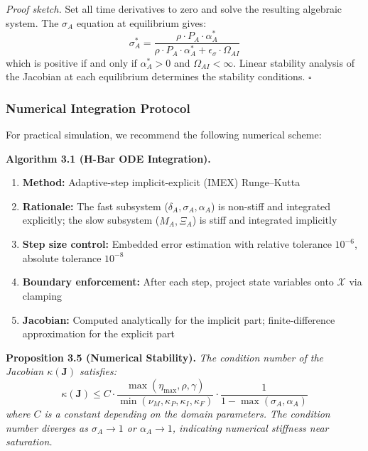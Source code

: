 \documentclass[11pt,a4paper]{article}
\begin{document}
\textit{Proof sketch.} Set all time derivatives to zero and solve the
resulting algebraic system. The $\sigma_A$ equation at equilibrium gives:
\begin{equation}\label{eq:sigma-equilibrium}
\sigma_A^* = \frac{\rho \cdot P_A \cdot \alpha_A^*}{\rho \cdot P_A \cdot \alpha_A^* + \epsilon_\sigma \cdot \Omega_{AI}}
\end{equation}
which is positive if and only if $\alpha_A^* > 0$ and $\Omega_{AI} < \infty$.
Linear stability analysis of the Jacobian at each equilibrium determines
the stability conditions. $\square$

\subsubsection{Numerical Integration Protocol}\label{sec:numerical-protocol}

For practical simulation, we recommend the following numerical scheme:

\textbf{Algorithm 3.1 (H-Bar ODE Integration).}
\begin{enumerate}[nosep]
\item \textbf{Method:} Adaptive-step implicit-explicit (IMEX) Runge--Kutta
\item \textbf{Rationale:} The fast subsystem ($\delta_A, \sigma_A, \alpha_A$) is non-stiff and integrated explicitly; the slow subsystem ($\hat{M}_A, \Xi_A$) is stiff and integrated implicitly
\item \textbf{Step size control:} Embedded error estimation with relative tolerance $10^{-6}$, absolute tolerance $10^{-8}$
\item \textbf{Boundary enforcement:} After each step, project state variables onto $\mathcal{X}$ via clamping
\item \textbf{Jacobian:} Computed analytically for the implicit part; finite-difference approximation for the explicit part
\end{enumerate}

\textbf{Proposition 3.5 (Numerical Stability).}
\textit{The condition number of the Jacobian $\kappa(\mathbf{J})$ satisfies:
\begin{equation}\label{eq:condition-number}
\kappa(\mathbf{J}) \leq C \cdot \frac{\max(\eta_{\max}, \rho, \gamma)}{\min(\nu_M, \kappa_P, \kappa_I, \kappa_F)} \cdot \frac{1}{1 - \max(\sigma_A, \alpha_A)}
\end{equation}
where $C$ is a constant depending on the domain parameters. The condition
number diverges as $\sigma_A \to 1$ or $\alpha_A \to 1$, indicating
numerical stiffness near saturation.}
\end{document}
